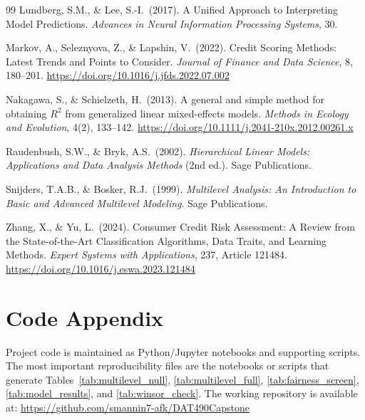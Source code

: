 \documentclass[12pt,letterpaper]{article}
\begin{document}
\begin{thebibliography}{99}
Lundberg, S.M., \& Lee, S.-I.\ (2017).
A Unified Approach to Interpreting Model Predictions.
\textit{Advances in Neural Information Processing Systems}, 30.

Markov, A., Seleznyova, Z., \& Lapshin, V.\ (2022).
Credit Scoring Methods: Latest Trends and Points to Consider.
\textit{Journal of Finance and Data Science}, 8, 180--201.
\url{https://doi.org/10.1016/j.jfds.2022.07.002}

Nakagawa, S., \& Schielzeth, H.\ (2013).
A general and simple method for obtaining $R^2$ from generalized linear mixed-effects models.
\textit{Methods in Ecology and Evolution}, 4(2), 133--142.
\url{https://doi.org/10.1111/j.2041-210x.2012.00261.x}

Raudenbush, S.W., \& Bryk, A.S.\ (2002).
\textit{Hierarchical Linear Models: Applications and Data Analysis Methods} (2nd ed.).
Sage Publications.

Snijders, T.A.B., \& Bosker, R.J.\ (1999).
\textit{Multilevel Analysis: An Introduction to Basic and Advanced Multilevel Modeling}.
Sage Publications.

Zhang, X., \& Yu, L.\ (2024).
Consumer Credit Risk Assessment: A Review from the State-of-the-Art Classification Algorithms, Data Traits, and Learning Methods.
\textit{Expert Systems with Applications}, 237, Article 121484.
\url{https://doi.org/10.1016/j.eswa.2023.121484}

\end{thebibliography}

\appendix
\section{Code Appendix}

Project code is maintained as Python/Jupyter notebooks and supporting scripts. The most important
reproducibility files are the notebooks or scripts that generate Tables~\ref{tab:multilevel_null},
\ref{tab:multilevel_full}, \ref{tab:fairness_screen}, \ref{tab:model_results}, and
\ref{tab:winsor_check}. The working repository is available at:
\url{https://github.com/smannin7-afk/DAT490Capstone}
\end{document}

